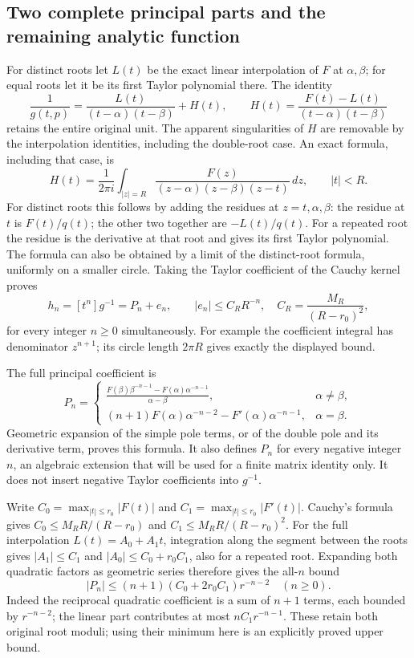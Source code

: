 \documentclass[11pt]{article}
\begin{document}
\subsection{Two complete principal parts and the remaining analytic function}
For distinct roots let $L(t)$ be the exact linear interpolation of
$F$ at $\alpha,\beta$; for equal roots let it be its first Taylor
polynomial there.  The identity
\[
 \frac1{g(t,p)}=\frac{L(t)}{(t-\alpha)(t-\beta)}+H(t),\qquad
 H(t)=\frac{F(t)-L(t)}{(t-\alpha)(t-\beta)}
 \tag{RCM2}
\]
retains the entire original unit.  The apparent singularities of
$H$ are removable by the interpolation identities, including the
double-root case.  An exact formula, including that case, is
\[
 H(t)=\frac1{2\pi i}\int_{|z|=R}
       \frac{F(z)}{(z-\alpha)(z-\beta)(z-t)}\,dz,
 \qquad |t|<R.
 \tag{RCM3}
\]
For distinct roots this follows by adding the residues at
$z=t,\alpha,\beta$: the residue at $t$ is $F(t)/q(t)$;
the other two together are $-L(t)/q(t)$.  For a repeated root
the residue is the derivative at that root and gives its first
Taylor polynomial.  The formula can also be obtained by a limit
of the distinct-root formula, uniformly on a smaller circle.
Taking the Taylor coefficient of the Cauchy kernel proves
\[
 h_n=[t^n]g^{-1}=P_n+e_n,\qquad
 |e_n|\le C_R R^{-n},\quad C_R=\frac{M_R}{(R-r_0)^2},
 \tag{RCM4}
\]
for every integer $n\ge0$ simultaneously.  For example the
coefficient integral has denominator $z^{n+1}$; its circle length
$2\pi R$ gives exactly the displayed bound.

The full principal coefficient is
\[
 P_n=\begin{cases}
 \displaystyle\frac{F(\beta)\beta^{-n-1}-F(\alpha)\alpha^{-n-1}}
                         {\alpha-\beta},&\alpha\ne\beta,\\[6pt]
 \displaystyle (n+1)F(\alpha)\alpha^{-n-2}
                  -F'(\alpha)\alpha^{-n-1},&\alpha=\beta.
 \end{cases}
 \tag{RCM5}
\]
Geometric expansion of the simple pole terms, or of the double
pole and its derivative term, proves this formula.  It also
defines $P_n$ for every negative integer $n$, an algebraic
extension that will be used for a finite matrix identity only.
It does not insert negative Taylor coefficients into $g^{-1}$.

Write $C_0=\max_{|t|\le r_0}|F(t)|$ and
$C_1=\max_{|t|\le r_0}|F'(t)|$.  Cauchy's formula gives
$C_0\le M_R R/(R-r_0)$ and
$C_1\le M_R R/(R-r_0)^2$.
For the full interpolation $L(t)=A_0+A_1t$, integration along
the segment between the roots gives $|A_1|\le C_1$ and
$|A_0|\le C_0+r_0C_1$, also for a repeated root.
Expanding both quadratic factors as geometric series therefore
gives the all-$n$ bound
\[
 |P_n|\le(n+1)(C_0+2r_0C_1)r^{-n-2}\quad(n\ge0).
 \tag{RCM6}
\]
Indeed the reciprocal quadratic coefficient is a sum of $n+1$
terms, each bounded by $r^{-n-2}$; the linear part contributes
at most $nC_1r^{-n-1}$.  These retain both original root moduli;
using their minimum here is an explicitly proved upper bound.
\end{document}
